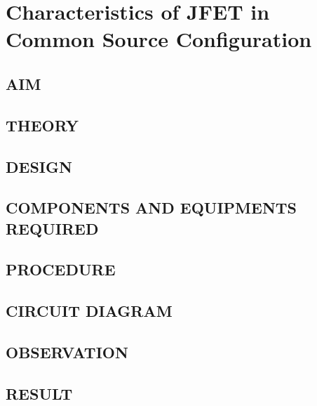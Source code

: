\chapter[Characteristics of JFET in Common Drain Configuration]{Characteristics of JFET in Common Source Configuration}
\section*[AIM]{AIM}
\section*[THEORY]{THEORY}
\section*[DESIGN]{DESIGN}
\section*[COMPONENTS AND EQUIPMENTS REQUIRED]{COMPONENTS AND EQUIPMENTS REQUIRED}
\section*[PROCEDURE]{PROCEDURE}
\section*[CIRCUIT DIAGRAM]{CIRCUIT DIAGRAM}
\section*[OBSERVATION]{OBSERVATION}
\section*[RESULT]{RESULT}
